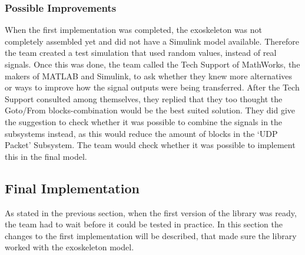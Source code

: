 \subsubsection{Possible Improvements}
When the first implementation was completed, the exoskeleton was not completely assembled yet and did not have a Simulink model available. Therefore the team created a test simulation that used random values, instead of real signals. Once this was done, the team called the Tech Support of MathWorks, the makers of MATLAB and Simulink, to ask whether they knew more alternatives or ways to improve how the signal outputs were being transferred. After the Tech Support consulted among themselves, they replied that they too thought the Goto/From blocks-combination would be the best suited solution. They did give the suggestion to check whether it was possible to combine the signals in the subsystems instead, as this would reduce the amount of blocks in the `UDP Packet' Subsystem. The team would check whether it was possible to implement this in the final model.

\subsection{Final Implementation}\label{sec:simfinim}
As stated in the previous section, when the first version of the library was ready, the team had to wait before it could be tested in practice. In this section the changes to the first implementation will be described, that made sure the library worked with the exoskeleton model.



